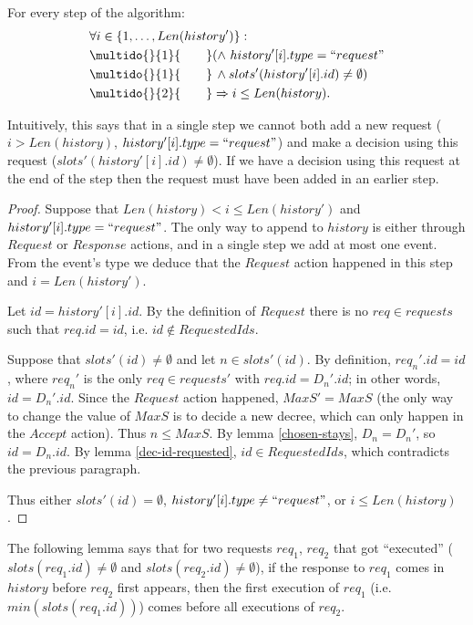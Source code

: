 \documentclass[12pt,a4paper,en]{pracamgr}
\newcommand{\ind}[1]{\multido{}{#1}{\qquad}}
\begin{document}
\begin{lemma}\label{req-later-decide}
    For every step of the algorithm:
    \begin{align*}
        & \forall i \in \{1, \dots, Len(history')\}:\\
        & \ind{1} (\land\ history'[i].type = ``request"\\
        & \ind{1}\,\land slots'(history'[i].id) \neq \emptyset)\\
        & \ind{2} \Rightarrow i \le Len(history).
    \end{align*}
\end{lemma}
Intuitively, this says that in a single step we cannot both add a new request ($i > Len(history)$, $history'[i].type = ``request"$) and make a decision using this request ($slots'(history'[i].id) \neq \emptyset$). If we have a decision using this request at the end of the step then the request must have been added in an earlier step.
\begin{proof}
    Suppose that $Len(history) < i \le Len(history')$ and $history'[i].type = ``request"$. The only way to append to $history$ is either through $Request$ or $Response$ actions, and in a single step we add at most one event. From the event's type we deduce that the $Request$ action happened in this step and $i = Len(history')$.

    Let $id = history'[i].id$. By the definition of $Request$ there is no $req \in requests$ such that $req.id = id$, i.e. $id \notin RequestedIds$.

    Suppose that $slots'(id) \neq \emptyset$ and let $n \in slots'(id)$. By definition, $req_n'.id = id$, where $req_n'$ is the only $req \in requests'$ with $req.id = D_n'.id$; in other words, $id = D_n'.id$. Since the $Request$ action happened, $MaxS' = MaxS$ (the only way to change the value of $MaxS$ is to decide a new decree, which can only happen in the $Accept$ action). Thus $n \le MaxS$. By lemma \ref{chosen-stays}, $D_n = D_n'$, so $id = D_n.id$. By lemma \ref{dec-id-requested}, $id \in RequestedIds$, which contradicts the previous paragraph.

    Thus either $slots'(id) = \emptyset$, $history'[i].type \neq ``request"$, or $i \le Len(history)$.
\end{proof}

The following lemma says that for two requests $req_1$, $req_2$ that got ``executed'' ($slots(req_1.id) \neq \emptyset$ and $slots(req_2.id) \neq \emptyset$), if the response to $req_1$ comes in $history$ before $req_2$ first appears, then the first execution of $req_1$ (i.e. $min(slots(req_1.id))$) comes before all executions of $req_2$.
\end{document}
